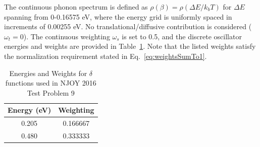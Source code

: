 \documentclass[Master.tex]{subfiles}
\begin{document}
  The continuous phonon spectrum is defined as $\rho(\beta)=\rho(\Delta E/k_bT)$ for $\Delta E$ spanning from 0-0.16575 eV, where the energy grid is uniformly spaced in increments of 0.00255 eV. No translational/diffusive contribution is considered ($\omega_t=0$). The continuous weighting $\omega_s$ is set to 0.5, and the discrete oscillator energies and weights are provided in Table~\ref{tab:test9_delta_facts}. Note that the listed weights satisfy the normalization requirement stated in Eq.~\ref{eq:weightsSumTo1}.
  \begin{table}[h]
    \centering
    \caption[Energies and Weights for $\delta$ functions used in NJOY 2016 Test Problem 9]{Energies and Weights for $\delta$ functions used in NJOY 2016 Test Problem 9}
    \label{tab:test9_delta_facts}
    \begin{tabular}{ |c|c| }\hline
      Energy (eV)& Weighting\\\hline
      0.205& 0.166667\\\hline
      0.480 & 0.333333 \\\hline
    \end{tabular}\\[1ex]
  \end{table}
\end{document}
